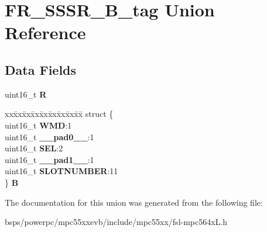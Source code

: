 \hypertarget{unionFR__SSSR__16B__tag}{}\section{F\+R\+\_\+\+S\+S\+S\+R\+\_\+B\+\_\+tag Union Reference}
\label{unionFR__SSSR__16B__tag}
\subsection*{Data Fields}
\begin{DoxyCompactItemize}
\item 
\mbox{\label{unionFR__SSSR__16B__tag_af74d6a289db8763653551a0516f1c084}} 
uint16\+\_\+t {\bfseries R}
\item 
\mbox{\label{unionFR__SSSR__16B__tag_af80eba954dc019f019f4a495a0bb4b31}} 
\begin{tabbing}
xx\=xx\=xx\=xx\=xx\=xx\=xx\=xx\=xx\=\kill
struct \{\\
\>uint16\_t {\bfseries WMD}:1\\
\>uint16\_t {\bfseries \_\_pad0\_\_}:1\\
\>uint16\_t {\bfseries SEL}:2\\
\>uint16\_t {\bfseries \_\_pad1\_\_}:1\\
\>uint16\_t {\bfseries SLOTNUMBER}:11\\
\} {\bfseries B}\\

\end{tabbing}\end{DoxyCompactItemize}


The documentation for this union was generated from the following file\+:\begin{DoxyCompactItemize}
\item 
bsps/powerpc/mpc55xxevb/include/mpc55xx/fsl-\/mpc564x\+L.\+h\end{DoxyCompactItemize}
